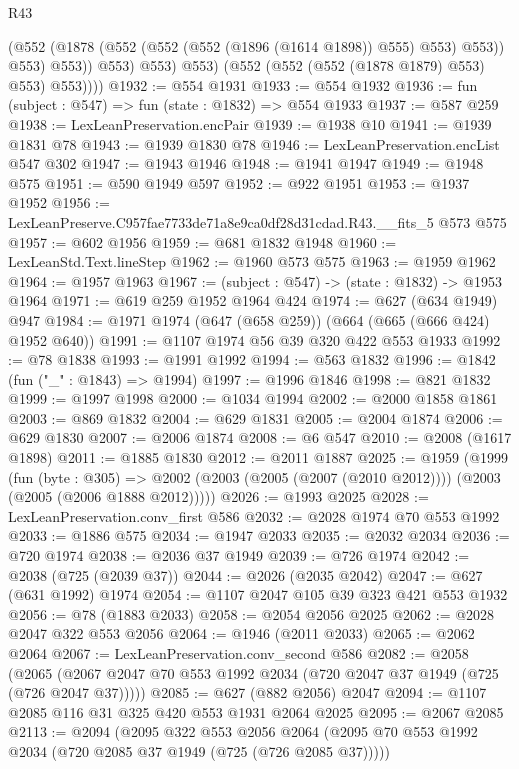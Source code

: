 \begin{lexlean}{R43}
\begin{coremodule}
                    (@552 (@1878 (@552 (@552 (@552 (@1896 (@1614 @1898)) @555) @553) @553)) @553)
                    @553))
                @553)
              @553)
            @553)
          (@552 (@552 (@552 (@1878 @1879) @553) @553) @553))))
@1932 := @554 @1931
@1933 := @554 @1932
@1936 := fun (subject : @547) => fun (state : @1832) => @554 @1933
@1937 := @587 @259
@1938 := LexLeanPreservation.encPair
@1939 := @1938 @10
@1941 := @1939 @1831 @78
@1943 := @1939 @1830 @78
@1946 := LexLeanPreservation.encList @547 @302
@1947 := @1943 @1946
@1948 := @1941 @1947
@1949 := @1948 @575
@1951 := @590 @1949 @597
@1952 := @922 @1951
@1953 := @1937 @1952
@1956 := LexLeanPreserve.C957fae7733de71a8e9ca0df28d31cdad.R43.__fits_5 @573 @575
@1957 := @602 @1956
@1959 := @681 @1832 @1948
@1960 := LexLeanStd.Text.lineStep
@1962 := @1960 @573 @575
@1963 := @1959 @1962
@1964 := @1957 @1963
@1967 := (subject : @547) -> (state : @1832) -> @1953 @1964
@1971 := @619 @259 @1952 @1964 @424
@1974 := @627 (@634 @1949) @947
@1984 := @1971 @1974 (@647 (@658 @259)) (@664 (@665 (@666 @424) @1952 @640))
@1991 := @1107 @1974 @56 @39 @320 @422 @553 @1933
@1992 := @78 @1838
@1993 := @1991 @1992
@1994 := @563 @1832
@1996 := @1842 (fun ("_" : @1843) => @1994)
@1997 := @1996 @1846
@1998 := @821 @1832
@1999 := @1997 @1998
@2000 := @1034 @1994
@2002 := @2000 @1858 @1861
@2003 := @869 @1832
@2004 := @629 @1831
@2005 := @2004 @1874
@2006 := @629 @1830
@2007 := @2006 @1874
@2008 := @6 @547
@2010 := @2008 (@1617 @1898)
@2011 := @1885 @1830
@2012 := @2011 @1887
@2025 := @1959
    (@1999
      (fun (byte : @305) =>
      @2002 (@2003 (@2005 (@2007 (@2010 @2012)))) (@2003 (@2005 (@2006 @1888 @2012)))))
@2026 := @1993 @2025
@2028 := LexLeanPreservation.conv_first @586
@2032 := @2028 @1974 @70 @553 @1992
@2033 := @1886 @575
@2034 := @1947 @2033
@2035 := @2032 @2034
@2036 := @720 @1974
@2038 := @2036 @37 @1949
@2039 := @726 @1974
@2042 := @2038 (@725 (@2039 @37))
@2044 := @2026 (@2035 @2042)
@2047 := @627 (@631 @1992) @1974
@2054 := @1107 @2047 @105 @39 @323 @421 @553 @1932
@2056 := @78 (@1883 @2033)
@2058 := @2054 @2056 @2025
@2062 := @2028 @2047 @322 @553 @2056
@2064 := @1946 (@2011 @2033)
@2065 := @2062 @2064
@2067 := LexLeanPreservation.conv_second @586
@2082 := @2058
    (@2065 (@2067 @2047 @70 @553 @1992 @2034 (@720 @2047 @37 @1949 (@725 (@726 @2047 @37)))))
@2085 := @627 (@882 @2056) @2047
@2094 := @1107 @2085 @116 @31 @325 @420 @553 @1931 @2064 @2025
@2095 := @2067 @2085
@2113 := @2094
    (@2095
      @322
      @553
      @2056
      @2064
      (@2095 @70 @553 @1992 @2034 (@720 @2085 @37 @1949 (@725 (@726 @2085 @37)))))

\end{coremodule}
\end{lexlean}
